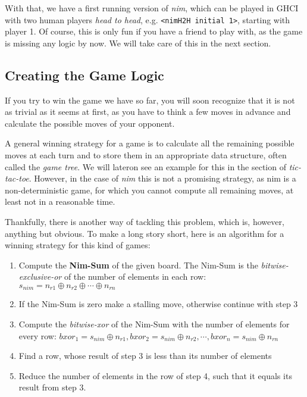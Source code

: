 With that, we have a first running version of \emph{nim}, which can be played in GHCI with two human players \emph{head to head}, e.g. \texttt{<nimH2H initial 1>}, starting with player 1.
Of course, this is only fun if you have a friend to play with, as the game is missing any logic by now. We will take care of this in the next section.

\subsection{Creating the Game Logic}

If you try to win the game we have so far, you will soon recognize that it is not as trivial as it seems at first, as you have to think a few moves in advance and calculate the possible moves of your opponent.

A general winning strategy for a game is to calculate all the remaining possible moves at each turn and to store them in an appropriate data structure, often called the \emph{game tree}.
We will lateron see an example for this in the section of \emph{tic-tac-toe}.
However, in the case of \emph{nim} this is not a promising strategy, as nim is a non-deterministic game, for which you cannot compute all remaining moves, at least not in a reasonable time.

Thankfully, there is another way of tackling this problem, which is, however, anything but obvious. To make a long story short, here is an algorithm for a winning strategy for this kind of games:

\begin{enumerate}
\item Compute the \textbf{Nim-Sum} of the given board. The Nim-Sum is the \emph{bitwise-exclusive-or} of the number of elements in each row: $s_{nim} = n_{r1} \oplus n_{r2} \oplus \cdots \oplus n_{rn}$
\item If the Nim-Sum is zero make a stalling move, otherwise continue with step 3
\item Compute the \emph{bitwise-xor} of the Nim-Sum with the number of elements for every row: $bxor_1 = s_{nim} \oplus n_{r1}, bxor_2 = s_{nim} \oplus n_{r2}, \cdots , bxor_n = s_{nim} \oplus n_{rn}$
\item Find a row, whose result of step 3 is less than its number of elements
\item Reduce the number of elements in the row of step 4, such that it equals its result from step 3.  
\end{enumerate}

